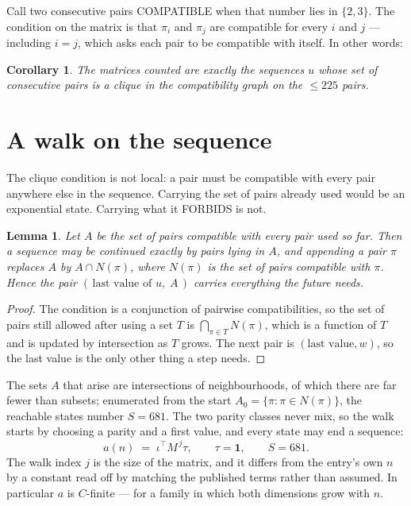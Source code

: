 \documentclass[11pt,a4paper]{article}
\theoremstyle{plain}
\newtheorem{lemma}[theorem]{Lemma}
\newtheorem{corollary}[theorem]{Corollary}
\theoremstyle{definition}
\begin{document}
Call two consecutive pairs COMPATIBLE when that number lies in $\{2,3\}$. The condition on the
matrix is that $\pi_i$ and $\pi_j$ are compatible for every $i$ and $j$ --- including $i=j$,
which asks each pair to be compatible with itself. In other words:

\begin{corollary}
The matrices counted are exactly the sequences $u$ whose set of consecutive pairs is a clique in
the compatibility graph on the $\le 225$ pairs.
\end{corollary}

\section{A walk on the sequence}

The clique condition is not local: a pair must be compatible with every pair anywhere else in
the sequence. Carrying the set of pairs already used would be an exponential state. Carrying
what it FORBIDS is not.

\begin{lemma}\label{lem:lump}
Let $A$ be the set of pairs compatible with every pair used so far. Then a sequence may be
continued exactly by pairs lying in $A$, and appending a pair $\pi$ replaces $A$ by
$A\cap N(\pi)$, where $N(\pi)$ is the set of pairs compatible with $\pi$. Hence the pair
$(\,\text{last value of }u,\;A\,)$ carries everything the future needs.
\end{lemma}

\begin{proof}
The condition is a conjunction of pairwise compatibilities, so the set of pairs still allowed
after using a set $T$ is $\bigcap_{\pi\in T}N(\pi)$, which is a function of $T$ and is updated
by intersection as $T$ grows. The next pair is $(\text{last value},w)$, so the last value is
the only other thing a step needs.
\end{proof}

The sets $A$ that arise are intersections of neighbourhoods, of which there are far fewer than
subsets; enumerated from the start $A_0=\{\pi:\pi\in N(\pi)\}$, the reachable states number
$S=681$. The two parity classes never mix, so the walk starts by choosing a parity and a first
value, and every state may end a sequence:
\[
a(n)\;=\;\iota^{\!\top}M^{\,j}\tau ,\qquad \tau=\mathbf{1},\qquad S=681.
\]
The walk index $j$ is the size of the matrix, and it differs from the entry's own $n$ by a
constant read off by matching the published terms rather than assumed. In particular $a$ is
$C$-finite --- for a family in which both dimensions grow with $n$.
\end{document}

